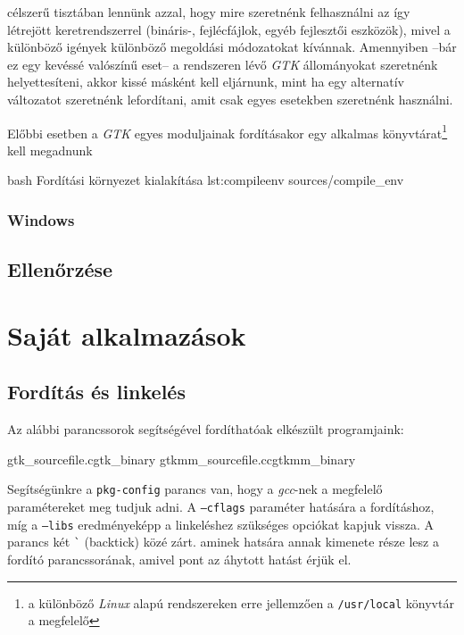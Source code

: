 célszerű tisztában lennünk azzal, hogy mire szeretnénk felhasználni az így létrejött keretrendszerrel (bináris-, fejlécfájlok, egyéb fejlesztői eszközök), mivel a különböző igények különböző megoldási módozatokat kívánnak. Amennyiben --bár ez egy kevéssé valószínű eset-- a rendszeren lévő \textit{GTK} állományokat szeretnénk helyettesíteni, akkor kissé másként kell eljárnunk, mint ha egy alternatív változatot szeretnénk lefordítani, amit csak egyes esetekben szeretnénk használni.




Előbbi esetben a \textit{GTK} egyes moduljainak fordításakor egy alkalmas könyvtárat\footnote{a különböző \textit{Linux} alapú rendszereken erre jellemzően a \texttt{/usr/local} könyvtár a megfelelő} kell megadnunk 

\lstinputfile
{bash}
{Fordítási környezet kialakítása}
{lst:compileenv}
{sources/compile_env}

\subsubsection{Windows}

\subsection{Ellenőrzése}

\section{Saját alkalmazások}

\subsection{Fordítás és linkelés}
\label{sec:compilingandlinking}

Az alábbi parancssorok segítségével fordíthatóak elkészült programjaink:

\lstcompiles
{gtk\_sourcefile.c}{gtk\_binary}
{gtkmm\_sourcefile.cc}{gtkmm\_binary}

Segítségünkre a \texttt{pkg-config} parancs van, hogy a \textit{gcc}-nek a megfelelő paramétereket meg tudjuk adni. A \texttt{--cflags} paraméter hatására a fordításhoz, míg a \texttt{--libs} eredményeképp a linkeléshez szükséges opciókat kapjuk vissza. A parancs két \texttt{\`} (backtick) közé zárt. aminek hatsára annak kimenete része lesz a fordító parancssorának, amivel pont az áhytott hatást érjük el.

